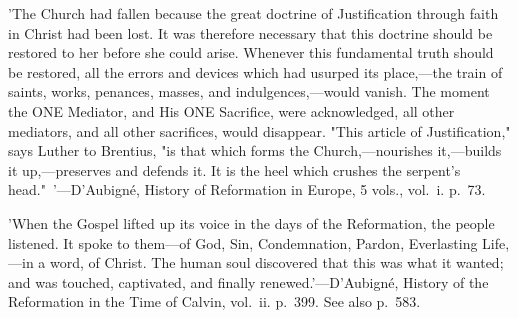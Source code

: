 \documentclass[
]{book}
\begin{document}
{  'The Church had fallen because the great doctrine of Justification through faith in Christ had been lost. It was therefore necessary that this doctrine should be restored to her before she could arise. Whenever this fundamental truth should be restored, all the errors and devices which had usurped its place,---the train of saints, works, penances, masses, and indulgences,---would vanish. The moment the ONE Mediator, and His ONE Sacrifice, were acknowledged, all other mediators, and all other sacrifices, would disappear. "This article of Justification," says Luther to Brentius, "is that which forms the Church,---nourishes it,---builds it up,---preserves and defends it. It is the heel which crushes the serpent's head."~'---D'Aubigné, History of Reformation in Europe, 5 vols., vol.~i. p.~73.

  'When the Gospel lifted up its voice in the days of the Reformation, the people listened. It spoke to them---of God, Sin, Condemnation, Pardon, Everlasting Life,---in a word, of Christ. The human soul discovered that this was what it wanted; and was touched, captivated, and finally renewed.'---D'Aubigné, History of the Reformation in the Time of Calvin, vol.~ii. p.~399. See also p.~583.}
\end{document}

